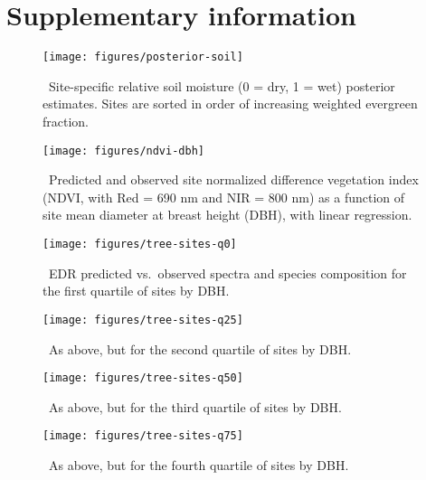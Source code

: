\section{Supplementary information}

\begin{figure}[ht]
  \centering
  \texttt{[image: figures/posterior-soil]}
  \caption{\label{fig:posterior-soil}\
    Site-specific relative soil moisture (0 = dry, 1 = wet) posterior estimates.
    Sites are sorted in order of increasing weighted evergreen fraction.
  }
\end{figure}

\clearpage

\begin{figure}[ht]
  \centering
  \texttt{[image: figures/ndvi-dbh]}
  \caption{\label{fig:ndvi-dbh}\
    Predicted and observed site normalized difference vegetation index (NDVI, with Red = 690 nm and NIR = 800 nm)
    as a function of site mean diameter at breast height (DBH), with linear regression.
  }
\end{figure}

\clearpage

\begin{figure}[ht]
  \centering
  \texttt{[image: figures/tree-sites-q0]}
  \caption{\label{fig:tree-sites-q0}\
    EDR predicted vs.\ observed spectra and species composition for the first quartile of sites by DBH.
  }
\end{figure}

\clearpage

\begin{figure}[ht]
  \centering
  \texttt{[image: figures/tree-sites-q25]}
  \caption{\label{fig:tree-sites-q25}\
    As above, but for the second quartile of sites by DBH.
  }
\end{figure}

\clearpage

\begin{figure}[ht]
  \centering
  \texttt{[image: figures/tree-sites-q50]}
  \caption{\label{fig:tree-sites-q50}\
    As above, but for the third quartile of sites by DBH.
  }
\end{figure}

\clearpage

\begin{figure}[ht]
  \centering
  \texttt{[image: figures/tree-sites-q75]}
  \caption{\label{fig:tree-sites-q75}\
    As above, but for the fourth quartile of sites by DBH.
  }
\end{figure}

